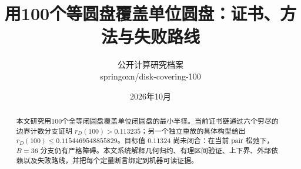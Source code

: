 \documentclass[UTF8,11pt]{ctexart}
\title{用100个等圆盘覆盖单位圆盘：证书、方法与失败路线}
\author{公开计算研究档案\\\small springoxn/disk-covering-100}
\date{2026年10月}
\begin{document}
\maketitle
\begin{abstract}
本文研究用100个全等闭圆盘覆盖单位闭圆盘的最小半径。当前证书链通过六个穷尽的边界计数分支证明 $r_D(100)>0.113235$；另一个独立重放的具体构型给出 $r_D(100)\le0.1154469548855829$。目标值 $0.11324$ 尚未闭合：在当前 pair 松弛下，$B=36$ 分支仍有严格障碍。本文系统解释几何归约、有理区间验证、上下界、外部依赖以及失败路线，并把每个定量断言绑定到机器可读证据。
\end{abstract}






\end{document}
